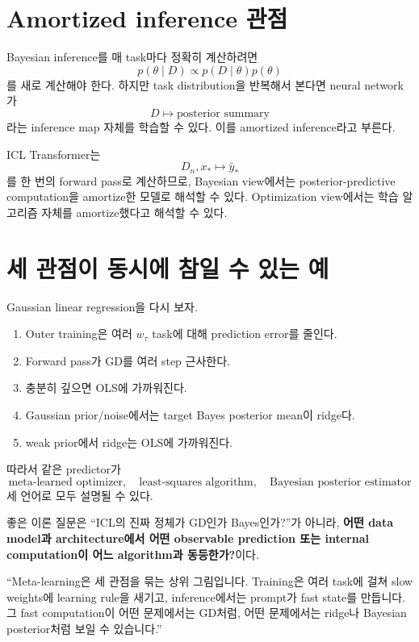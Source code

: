 \documentclass[11pt,a4paper,oneside,openany]{memoir}
\theoremstyle{definition}
\begin{document}
\section{Amortized inference 관점}

Bayesian inference를 매 task마다 정확히 계산하려면
\[
p(\theta\mid D)
\propto p(D\mid\theta)p(\theta)
\]
를 새로 계산해야 한다.
하지만 task distribution을 반복해서 본다면 neural network가
\[
D\mapsto \text{posterior summary}
\]
라는 inference map 자체를 학습할 수 있다.
이를 amortized inference라고 부른다.

ICL Transformer는
\[
D_n,x_*
\mapsto
\hat y_*
\]
를 한 번의 forward pass로 계산하므로,
Bayesian view에서는 posterior-predictive computation을 amortize한 모델로 해석할 수 있다.
Optimization view에서는 학습 알고리즘 자체를 amortize했다고 해석할 수 있다.

\section{세 관점이 동시에 참일 수 있는 예}

Gaussian linear regression을 다시 보자.

\begin{enumerate}
\item Outer training은 여러 $w_\tau$ task에 대해 prediction error를 줄인다.
\item Forward pass가 GD를 여러 step 근사한다.
\item 충분히 깊으면 OLS에 가까워진다.
\item Gaussian prior/noise에서는 target Bayes posterior mean이 ridge다.
\item weak prior에서 ridge는 OLS에 가까워진다.
\end{enumerate}

따라서 같은 predictor가
\[
\text{meta-learned optimizer},
\quad
\text{least-squares algorithm},
\quad
\text{Bayesian posterior estimator}
\]
세 언어로 모두 설명될 수 있다.

\begin{keybox}
좋은 이론 질문은 ``ICL의 진짜 정체가 GD인가 Bayes인가?''가 아니라, \textbf{어떤 data model과 architecture에서 어떤 observable prediction 또는 internal computation이 어느 algorithm과 동등한가?}이다.
\end{keybox}

\begin{presentbox}
``Meta-learning은 세 관점을 묶는 상위 그림입니다. Training은 여러 task에 걸쳐 slow weights에 learning rule을 새기고, inference에서는 prompt가 fast state를 만듭니다. 그 fast computation이 어떤 문제에서는 GD처럼, 어떤 문제에서는 ridge나 Bayesian posterior처럼 보일 수 있습니다.''
\end{presentbox}
\end{document}
